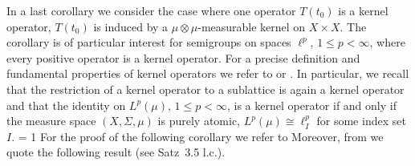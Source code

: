 In a last corollary we consider the case where one operator $T(t_{0})$ is a kernel operator, \ie  $T(t_{0})$ is induced by a $\mu \otimes \mu$-measurable kernel on $X \times X$.
The corollary is of particular interest for semigroups on spaces $\ell^{p}$, $1 \leq p < \infty$, where every positive operator is a kernel operator.
For a precise definition and fundamental properties of kernel operators we refer to \textcite[Section IV.9]{schaefer:1974} or \textcite[Chapter 13]{zaanen:1983}.
In particular, we recall that the restriction of a kernel operator to a sublattice is again a kernel operator and that
the identity on $L^{p}(\mu)$, $1 \leq p < \infty$, is a kernel operator if and only if the measure space $(X,\Sigma,\mu)$ is purely atomic, \ie  $L^{p}(\mu) \cong \ell^{p}_{I}$ for some index set $I$.
 = 1 
For the proof of the following corollary we refer to 
\textcite[Theorem 1]{gerlach:2017}
\fi
Moreover, from  \textcite{axmann:1980} we quote the following result (see Satz~3.5 l.c.).

